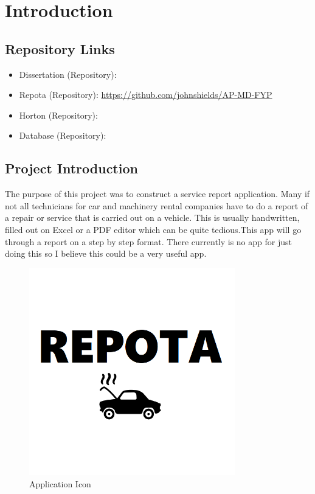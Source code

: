 \chapter{Introduction}
\section{Repository Links}
\begin{itemize}
    \item Dissertation (Repository):  %
    \item Repota (Repository): \url{https://github.com/johnshields/AP-MD-FYP} %
    \item Horton (Repository):  %
    \item Database (Repository):  %

\end{itemize}
\section{Project Introduction}
The purpose of this project was to construct a service report application. Many if not all technicians for car and machinery rental companies have to do a report of a repair or service that is carried out on a vehicle. This is usually handwritten, filled out on Excel or a PDF editor which can be quite tedious.This app will go through a report on a step by step format. There currently is no app for just doing this so I believe this could be a very useful app.
\begin{figure}[h!]
    \caption{Application Icon} %
    \label{image:repotaChatLogo}
    \centering
    \includegraphics[width=0.8\textwidth]{images/repotaLogo.png}
\end{figure}